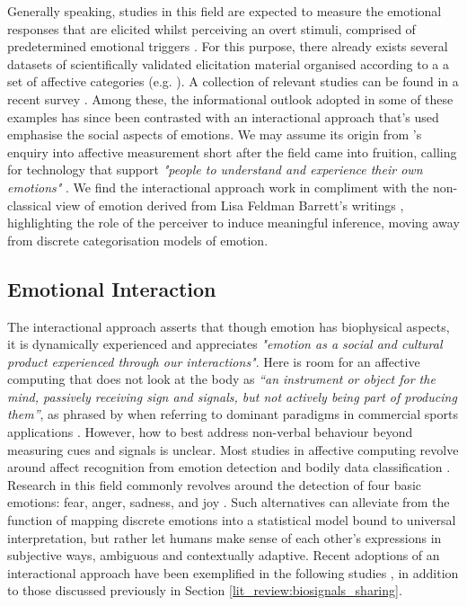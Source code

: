 Generally speaking, studies in this field are expected to measure the emotional responses that are elicited whilst perceiving an overt stimuli, comprised of predetermined emotional triggers \cite{bota_review_2019}. For this purpose, there already exists several datasets of scientifically validated elicitation material organised according to a a set of affective categories (e.g. \cite{yang_affective_2018,koelstra_deap_2012,bradley_affective_2007}). A collection of relevant studies can be found in a recent survey \cite{sanches_hci_2019}. Among these, the informational outlook adopted in some of these examples has since been contrasted with an interactional approach that's used emphasise the social aspects of emotions. We may assume its origin from \citeauthor{boehner_how_2007}'s enquiry into affective measurement short after the field came into fruition, calling for technology that support \textit{"people to understand and experience their own emotions"} \cite{boehner_how_2007,boehner_affect_2005}. We find the interactional approach work in compliment with the non-classical view of emotion derived from Lisa Feldman Barrett's writings \cite{barrett_how_2017}, highlighting the role of the perceiver to induce meaningful inference, moving away from discrete categorisation models of emotion.

\subsection{Emotional Interaction}

The interactional approach asserts that though emotion has biophysical aspects, it is dynamically experienced and appreciates \textit{"emotion as a social and cultural product experienced through our interactions"}. Here is room for an affective computing that does not look at the body as \textit{“an instrument or object for the mind, passively receiving sign and signals, but not actively being part of producing them”}, as phrased by \citeauthor{hook_kristina_affective_2012} when referring to dominant paradigms in commercial sports applications \cite{hook_kristina_affective_2012}. However, how to best address non-verbal behaviour beyond measuring cues and signals is unclear. Most studies in affective computing revolve around affect recognition from emotion detection and bodily data classification \cite{bota_review_2019}. Research in this field commonly revolves around the detection of four basic emotions: fear, anger, sadness, and joy \cite{picard_mit_nodate}. Such alternatives can alleviate from the function of mapping discrete emotions into a statistical model bound to universal interpretation, but rather let humans make sense of each other's expressions in subjective ways, ambiguous and contextually adaptive. Recent adoptions of an interactional approach have been exemplified in the following studies \cite{sanches_ambiguity_2019,umair_thermopixels_2020,fosh_see_2013}, in addition to those discussed previously in Section \ref{lit_review:biosignals_sharing}. 

